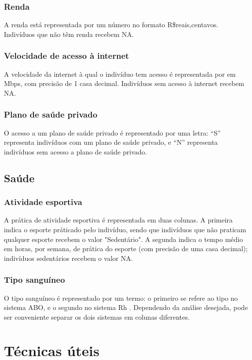 \documentclass{book}
\begin{document}
\subsection{Renda}
A renda está representada por um número no formato R\$reais,centavos. Indivíduos que não têm renda recebem NA.

\subsection{Velocidade de acesso à internet}
A velocidade da internet à qual o indivíduo tem acesso é representada por em Mbps, com precisão de 1 casa decimal. Indivíduos sem acesso à internet recebem NA.

\subsection{Plano de saúde privado}
O acesso a um plano de saúde privado é representado por uma letra: ``S'' representa indivíduos com um plano de saúde privado, e ``N'' representa indivíduos sem acesso a plano de saúde privado.

\section{Saúde}

\subsection{Atividade esportiva}
A prática de atividade esportiva é representada em duas colunas. A primeira indica o esporte práticado pelo indivíduo, sendo que indivíduos que não praticam qualquer esporte recebem o valor "Sedentário". A segunda indica o tempo médio em horas, por semana, de prática do esporte (com precisão de uma casa decimal); indivíduos sedentários recebem o valor NA.

\subsection{Tipo sanguíneo}
O tipo sanguíneo é representado por um termo: o primeiro se refere ao tipo no sistema ABO, e o segundo no sistema Rh . Dependendo da análise desejada, pode ser conveniente separar os dois sistemas em colunas diferentes.

\chapter{Técnicas úteis}
\end{document}
